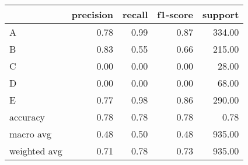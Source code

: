 \begin{tabular}{|l|r|r|r|r|}
\hline
{} &  precision &  recall &  f1-score &  support \\
\hline
A            &       0.78 &    0.99 &      0.87 &   334.00 \\
B            &       0.83 &    0.55 &      0.66 &   215.00 \\
C            &       0.00 &    0.00 &      0.00 &    28.00 \\
D            &       0.00 &    0.00 &      0.00 &    68.00 \\
E            &       0.77 &    0.98 &      0.86 &   290.00 \\
accuracy     &       0.78 &    0.78 &      0.78 &     0.78 \\
macro avg    &       0.48 &    0.50 &      0.48 &   935.00 \\
weighted avg &       0.71 &    0.78 &      0.73 &   935.00 \\
\hline
\end{tabular}
